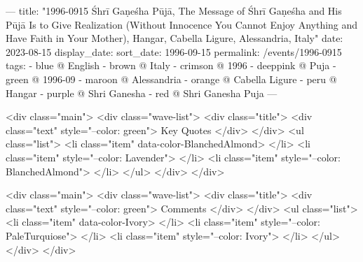 ---
title: "1996-0915 Śhrī Gaṇeśha Pūjā, The Message of Śhrī Gaṇeśha and His Pūjā Is to Give Realization (Without Innocence You Cannot Enjoy Anything and Have Faith in Your Mother), Hangar, Cabella Ligure, Alessandria, Italy"
date: 2023-08-15
display_date: 
sort_date: 1996-09-15
permalink: /events/1996-0915
tags:
  - blue @ English
  - brown @ Italy
  - crimson @ 1996
  - deeppink @ Puja
  - green @ 1996-09
  - maroon @ Alessandria
  - orange @ Cabella Ligure
  - peru @ Hangar
  - purple @ Shri Ganesha
  - red @ Shri Ganesha Puja
---

<div class="main">
  <div class="wave-list">
    <div class="title">
      <div class="text" style="--color: green">
        Key Quotes
      </div>
    </div>
    <ul class="list">
        <li class="item" data-color-BlanchedAlmond>
        </li>
        <li class="item" style="--color: Lavender">
        </li>
        <li class="item" style="--color: BlanchedAlmond">
        </li>
      </ul>
  </div>
</div>

<div class="main">
  <div class="wave-list">
    <div class="title">
      <div class="text" style="--color: green">
        Comments
      </div>
    </div>
    <ul class="list">
        <li class="item" data-color-Ivory>
        </li>
        <li class="item" style="--color: PaleTurquiose">
        </li>
        <li class="item" style="--color: Ivory">
        </li>
      </ul>
  </div>
</div>